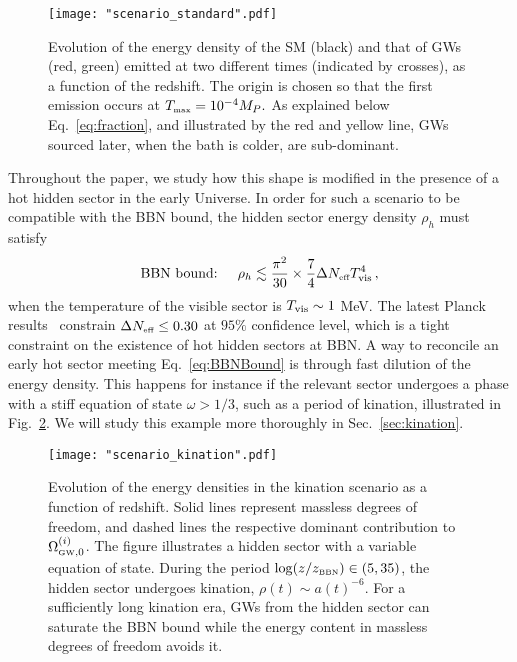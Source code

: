 \documentclass[a4paper,11pt]{article}
\newcommand{\tti}[1]{\text{\tiny{#1}}}
\begin{document}
\begin{figure}[t!]
\centering
\texttt{[image: "scenario\_standard".pdf]}  
\caption{
Evolution of the energy density of the SM (black) and that of GWs (red, green) emitted at two different times (indicated by crosses), as a function of the redshift.
The origin is chosen so that the first emission occurs at $T_{\tti{max}}=10^{-4}M_P.$
As explained below Eq.~\eqref{eq:fraction}, and illustrated by the red and yellow line, GWs sourced later, when the bath is colder, are sub-dominant. 
}
\label{fig:scenario1}
\end{figure}

Throughout the paper, we study how this shape is modified in the presence of a hot hidden sector in the early Universe.
In order for such a scenario to be compatible with the BBN bound, the hidden sector energy density $\rho_h$ must satisfy
\begin{equation}\label{eq:BBNBound} 
\text{BBN bound: }\quad\rho_h \lesssim  \frac{\pi^2}{30}\times \frac{7}{4}\Delta N_{\text{\tiny{eff}}} T_{\rm vis}^4 \,,
\end{equation}
when the temperature of the visible sector is $T_{\rm vis}\sim 1 $ MeV. 
The latest Planck results~\cite{Planck:2018vyg} constrain $\Delta N_{\text{\tiny{eff}}} \leq 0.30$ at $95\%$ confidence level, which is a tight constraint on the existence of hot hidden sectors at BBN. 
A way to reconcile an early hot sector meeting Eq.~\eqref{eq:BBNBound} is through fast dilution of the energy density. 
This happens for instance if the relevant sector undergoes a phase with a stiff equation of state $\omega >1/3$, such as a period of kination, illustrated in Fig.~\ref{fig:scenario3}.
We will study this example more thoroughly in Sec.~\ref{sec:kination}.

\begin{figure}[t!]
\centering
\texttt{[image: "scenario\_kination".pdf]}
\caption{Evolution of the energy densities in the kination scenario as a function of redshift. Solid lines represent massless degrees of freedom, and dashed lines the respective dominant contribution to $\Omega^{(i)}_{\tti{GW},0}$. The figure illustrates a hidden sector with a variable equation of state. During the period $\log(z/z_{\tti{BBN}})\in (5,35)$, the hidden sector undergoes kination, $\rho(t) \sim a(t)^{-6}$. For a sufficiently long kination era, GWs from the hidden sector can saturate the BBN bound while the energy content in massless degrees of freedom avoids it.}
\label{fig:scenario3}
\end{figure}
\end{document}
